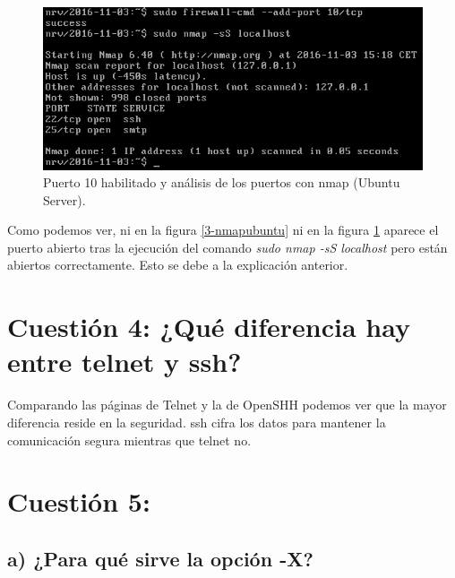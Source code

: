 \documentclass[a4paper,titlepage,12pt]{scrartcl}	%
\numberwithin{figure}{section} %
\numberwithin{table}{section} %
\begin{document}
	\begin{figure}[H]
		\includegraphics[width=\linewidth]{./Imagenes/3-nmapcentos.png}
		\vspace{-0.5cm}
		\caption[Puerto 10 habilitado y análisis de los puertos con nmap (Ubuntu Server).]{Puerto 10 habilitado y análisis de los puertos con nmap (Ubuntu Server).}
		\label{3-nmapcentos}
	\end{figure}
	
	Como podemos ver, ni en la figura \ref{3-nmapubuntu} ni en la figura \ref{3-nmapcentos} aparece el puerto abierto tras la ejecución del comando \textit{sudo nmap -sS localhost} pero están abiertos correctamente. Esto se debe a la explicación anterior.
	
	\section[Cuestión 4: ¿Qué diferencia hay entre telnet y ssh?]{Cuestión 4: ¿Qué diferencia hay entre telnet y ssh?}
	
	Comparando las páginas de Telnet \cite{telnet} y la de OpenSHH \cite{openssh} podemos ver que la mayor diferencia reside en la seguridad. ssh cifra los datos para mantener la comunicación segura mientras que telnet no.
	
	\section[Cuestión 5:]{Cuestión 5:}
	
	\subsection[a) ¿Para qué sirve la opción -X?]{a) ¿Para qué sirve la opción -X?}
	
\end{document}

